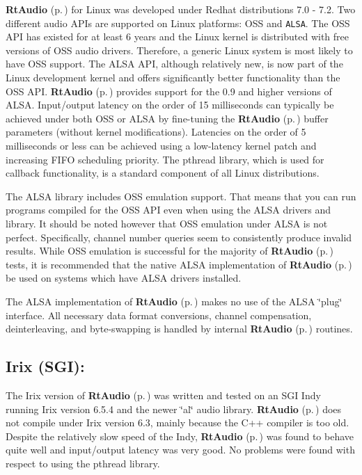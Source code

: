{\bf Rt\-Audio} {\rm (p.\,\pageref{classRtAudio})} for Linux was developed under Redhat distributions 7.0 - 7.2. Two different audio APIs are supported on Linux platforms: OSS and {\tt ALSA}. The OSS API has existed for at least 6 years and the Linux kernel is distributed with free versions of OSS audio drivers. Therefore, a generic Linux system is most likely to have OSS support. The ALSA API, although relatively new, is now part of the Linux development kernel and offers significantly better functionality than the OSS API. {\bf Rt\-Audio} {\rm (p.\,\pageref{classRtAudio})} provides support for the 0.9 and higher versions of ALSA. Input/output latency on the order of 15 milliseconds can typically be achieved under both OSS or ALSA by fine-tuning the {\bf Rt\-Audio} {\rm (p.\,\pageref{classRtAudio})} buffer parameters (without kernel modifications). Latencies on the order of 5 milliseconds or less can be achieved using a low-latency kernel patch and increasing FIFO scheduling priority. The pthread library, which is used for callback functionality, is a standard component of all Linux distributions.

The ALSA library includes OSS emulation support. That means that you can run programs compiled for the OSS API even when using the ALSA drivers and library. It should be noted however that OSS emulation under ALSA is not perfect. Specifically, channel number queries seem to consistently produce invalid results. While OSS emulation is successful for the majority of {\bf Rt\-Audio} {\rm (p.\,\pageref{classRtAudio})} tests, it is recommended that the native ALSA implementation of {\bf Rt\-Audio} {\rm (p.\,\pageref{classRtAudio})} be used on systems which have ALSA drivers installed.

The ALSA implementation of {\bf Rt\-Audio} {\rm (p.\,\pageref{classRtAudio})} makes no use of the ALSA \char`\"{}plug\char`\"{} interface. All necessary data format conversions, channel compensation, deinterleaving, and byte-swapping is handled by internal {\bf Rt\-Audio} {\rm (p.\,\pageref{classRtAudio})} routines.

\subsection{Irix (SGI):}\label{irix}


The Irix version of {\bf Rt\-Audio} {\rm (p.\,\pageref{classRtAudio})} was written and tested on an SGI Indy running Irix version 6.5.4 and the newer \char`\"{}al\char`\"{} audio library. {\bf Rt\-Audio} {\rm (p.\,\pageref{classRtAudio})} does not compile under Irix version 6.3, mainly because the C++ compiler is too old. Despite the relatively slow speed of the Indy, {\bf Rt\-Audio} {\rm (p.\,\pageref{classRtAudio})} was found to behave quite well and input/output latency was very good. No problems were found with respect to using the pthread library.

